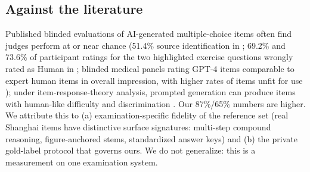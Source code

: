 \subsection{Against the literature}
Published blinded evaluations of AI-generated multiple-choice items often find judges perform at or near chance (51.4\% source identification in \cite{nursing2025}; 69.2\% and 73.6\% of participant ratings for the two highlighted exercise questions wrongly rated as Human in \cite{chatgptqg2025}; blinded medical panels rating GPT-4 items comparable to expert human items in overall impression, with higher rates of items unfit for use \cite{medicalteacher2025}); under item-response-theory analysis, prompted generation can produce items with human-like difficulty and discrimination \cite{anaquest2025}. Our 87\%/65\% numbers are higher. We attribute this to (a) examination-specific fidelity of the reference set (real Shanghai items have distinctive surface signatures: multi-step compound reasoning, figure-anchored stems, standardized answer keys) and (b) the private gold-label protocol that governs ours. We do not generalize: this is a measurement on one examination system.
